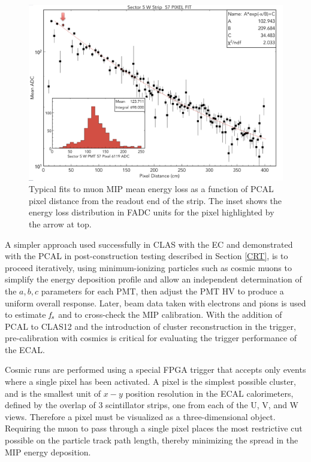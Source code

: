 \begin{figure}[hbt]
\centering
\includegraphics[width=1.0\columnwidth,keepaspectratio]{img/S9_1_2.png}
\caption[]{Typical fits to muon MIP mean energy loss as a function of PCAL pixel distance from the readout end of
  the strip. The inset shows the energy loss distribution in FADC units for the pixel highlighted by the arrow at top.}
\label{fig:S9_1_2}
\end{figure}

A simpler approach used successfully in CLAS with the EC and demonstrated with the PCAL in post-construction testing
described in Section \ref{CRT}, is to proceed iteratively, using minimum-ionizing particles such as cosmic muons to
simplify the energy deposition profile and allow an independent determination of the $a,b,c$ parameters for each
PMT, then adjust the PMT HV to produce a uniform overall response. Later, beam data taken with electrons and
pions is used to estimate ${\it f_s}$ and to cross-check the MIP calibration. With the addition of PCAL to CLAS12
and the introduction of cluster reconstruction in the trigger, pre-calibration with cosmics is critical for evaluating
the trigger performance of the ECAL.

Cosmic runs are performed using a special FPGA trigger that accepts only events where a single pixel has been
activated. A pixel is the simplest possible cluster, and is the smallest unit of $x-y$ position resolution in the ECAL
calorimeters, defined by the overlap of 3 scintillator strips, one from each of the U, V, and W views.  Therefore a pixel must be visualized as a three-dimensional object.  Requiring the
muon to pass through a single pixel places the most restrictive cut possible on the particle track path length,
thereby minimizing the spread in the MIP energy deposition.

